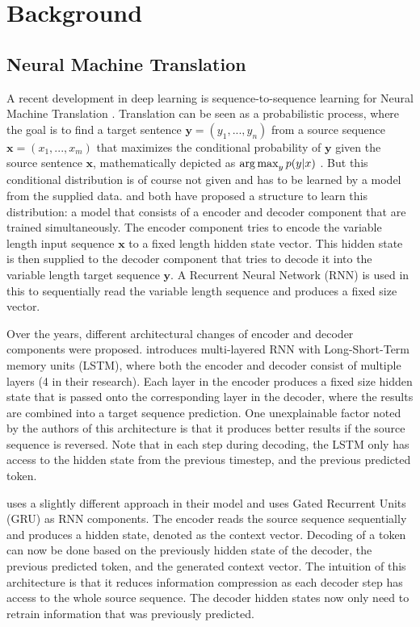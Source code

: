 \section{Background}\label{sec:background}
\subsection{Neural Machine Translation}
A recent development in deep learning is sequence-to-sequence learning for Neural Machine Translation \cite{sutskever2014sequence, cho2014learning}. Translation can be seen as a probabilistic process, where the goal is to find a target sentence $\mathbf{y} = (y_1,...,y_n)$ from a source sequence $\mathbf{x} = (x_1,...,x_m)$ that maximizes the conditional probability of $\mathbf{y}$ given the source sentence $\mathbf{x}$, mathematically depicted as $\operatorname*{arg\,max}_y p(y|x)$ \cite{bahdanau2014neural}. But this conditional distribution is of course not given and has to be learned by a model from the supplied data.  
\citeauthor{sutskever2014sequence} \cite{sutskever2014sequence} and \citeauthor{cho2014learning} \cite{cho2014learning} both have proposed a structure to learn this distribution: a model that consists of a encoder and decoder component that are trained simultaneously. The encoder component tries to encode the variable length input sequence $\mathbf{x}$ to a fixed length hidden state vector. This hidden state is then supplied to the decoder component that tries to decode it into the variable length target sequence $\mathbf{y}$. A Recurrent Neural Network (RNN) is used in this to sequentially read the variable length sequence and produces a fixed size vector.

Over the years, different architectural changes of encoder and decoder components were proposed. \citeauthor{sutskever2014sequence} \cite{sutskever2014sequence} introduces multi-layered RNN with Long-Short-Term memory units (LSTM), where both the encoder and decoder consist of multiple layers (4 in their research). Each layer in the encoder produces a fixed size hidden state that is passed onto the corresponding layer in the decoder, where the results are combined into a target sequence prediction. One unexplainable factor noted by the authors of this architecture is that it produces better results if the source sequence is reversed. Note that in each step during decoding, the LSTM only has access to the hidden state from the previous timestep, and the previous predicted token.

\citeauthor{cho2014learning} \cite{cho2014learning} uses a slightly different approach in their model and uses Gated Recurrent Units (GRU) as RNN components. The encoder reads the source sequence sequentially and produces a hidden state, denoted as the context vector. Decoding of a token can now be done based on the previously hidden state of the decoder, the previous predicted token, and the generated context vector. The intuition of this architecture is that it reduces information compression as each decoder step has access to the whole source sequence. The decoder hidden states now only need to retrain information that was previously predicted.


